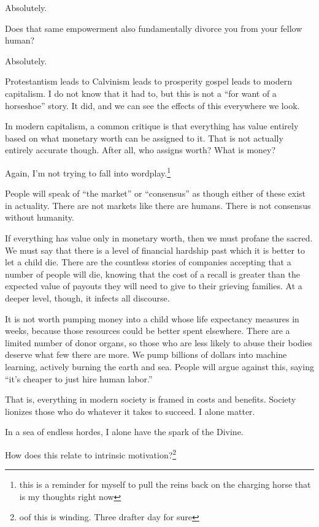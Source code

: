 \documentclass[12pt]{article}
\newcommand{\say}[1]{``#1''}
\renewcommand{\,}{\textsuperscript{,}}
\begin{document}
Absolutely.

Does that same empowerment also fundamentally divorce you from your fellow human?

Absolutely.

Protestantism leads to Calvinism leads to prosperity gospel leads to modern capitalism.  
I do not know that it had to, but this is not a \say{for want of a horseshoe} story.  
It did, and we can see the effects of this everywhere we look.

In modern capitalism, a common critique is that everything has value entirely based on what monetary worth can be assigned to it.  
That is not actually entirely accurate though.  
After all, who assigns worth?  
What is money?

Again, I'm not trying to fall into wordplay.\footnote{this is a reminder for myself to pull the reins back on the charging horse that is my thoughts right now}

People will speak of \say{the market} or \say{consensus} as though either of these exist in actuality.  
There are not markets like there are humans.  
There is not consensus without humanity.

If everything has value only in monetary worth, then we must profane the sacred.  
We must say that there is a level of financial hardship past which it is better to let a child die.  
There are the countless stories of companies accepting that a number of people will die, knowing that the cost of a recall is greater than the expected value of payouts they will need to give to their grieving families.  
At a deeper level, though, it infects all discourse.

It is not worth pumping money into a child whose life expectancy measures in weeks, because those resources could be better spent elsewhere.  
There are a limited number of donor organs, so those who are less likely to abuse their bodies deserve what few there are more.  
We pump billions of dollars into machine learning, actively burning the earth and sea.  
People will argue against this, saying \say{it's cheaper to just hire human labor.}

That is, everything in modern society is framed in costs and benefits.  
Society lionizes those who do whatever it takes to succeed.  
I alone matter.

In a sea of endless hordes, I alone have the spark of the Divine.

How does this relate to intrinsic motivation?\footnote{oof this is winding. Three drafter day for sure}
\end{document}
